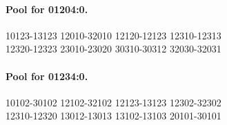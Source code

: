 \documentclass[11pt]{article}
\theoremstyle{remark}
\numberwithin{equation}{section}
\numberwithin{table}{section}
\begin{document}
\paragraph{Pool for 01204:0.}
\begingroup\footnotesize\ttfamily\begin{flushleft}
10123-13123 12010-32010 12120-12123 12310-12313\\
12320-12323 23010-23020 30310-30312 32030-32031\\
\end{flushleft}\endgroup
\paragraph{Pool for 01234:0.}
\begingroup\footnotesize\ttfamily\begin{flushleft}
10102-30102 12102-32102 12123-13123 12302-32302\\
12310-12320 13012-13013 13102-13103 20101-30101\\
\end{flushleft}\endgroup
\end{document}
